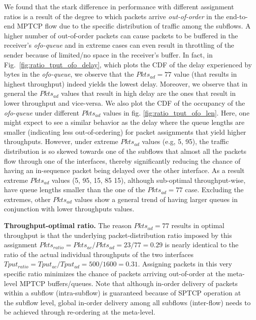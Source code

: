 We found that the stark difference in performance with different
assignment ratios is a result of the degree to which packets arrive
\textit{out-of-order} in the end-to-end MPTCP flow due to
the specific distribution of traffic among the subflows.
A higher number of out-of-order packets can cause
packets to be buffered in the receiver's \emph{ofo-queue} and in
extreme cases can even result in throttling of the sender because of
limited/no space in the receiver's buffer. In fact, in
Fig.~\ref{fig:ratio_tput_ofo_delay}, which plots the CDF of the delay
experienced by bytes in the \emph{ofo-queue}, we observe that
the $Pkts_{ad}=77$ value (that results in highest throughput) indeed
yields the lowest delay. Moreover, we observe that in general the
$Pkts_{ad}$ values that result in high delay are the ones that result
in lower throughput and vice-versa. We also plot the CDF of the
occupancy of the \emph{ofo-queue} under different $Pkts_{ad}$
values in fig. \ref{fig:ratio_tput_ofo_len}. Here, one might expect to
see a similar behavior as the delay where the queue lengths are smaller
(indicating less out-of-ordering) for packet assignments that yield
higher throughputs. However, under extreme $Pkts_{ad}$ values
(e.g, 5, 95), the traffic distribution is so skewed towards one of
the subflows that almost all the packets flow through one of
the interfaces, thereby significantly reducing the chance of having an
in-sequence packet being delayed over the other interface. As a result
extreme $Pkts_{ad}$ values (5, 95, 15, 85 15), although sub-optimal
throughput-wise, have queue lengths smaller than the one of the $Pkts_{ad}=77$ case.
Excluding the extremes, other $Pkts_{ad}$ values show a general trend of
having larger queues in conjunction with lower throughputs values.

\noindent\textbf{Throughput-optimal ratio.} The reason $Pkts_{ad}=77$ results in optimal throughput is that
the underlying packet-distribution ratio imposed by this assignment
$Pkts_{ratio}=Pkts_{ac}/Pkts_{ad}=23/77=0.29$ is nearly identical to
the ratio of the actual individual throughputs of the two interfaces
$Tput_{ratio}=Tput_{ac}/Tput_{ad}=500/1600=0.31$. Assigning packets in
this very specific ratio minimizes the chance of packets arriving
out-of-order at the meta-level MPTCP buffers/queues. Note that
although in-order delivery of packets within a subflow (intra-subflow)
is guaranteed because of SPTCP operation at the subflow level,
global in-order delivery among all subflows (inter-flow) needs
to be achieved through re-ordering at the meta-level.
